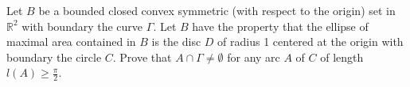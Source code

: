 \documentclass{article}
\begin{document}
	\setlength{\parindent}{0pt}
	Let $B$ be a bounded closed convex symmetric (with respect to the origin) set in $\mathbb{R}^2$ with boundary the curve $\Gamma$. Let $B$ have the property that the ellipse of maximal area contained in $B$ is the disc $D$ of radius 1 centered at the origin with boundary the circle $C$. Prove that $A\cap\Gamma\neq\emptyset$ for any arc $A$ of $C$ of length $l(A)\geq \frac{\pi}{2}$.
\end{document}
